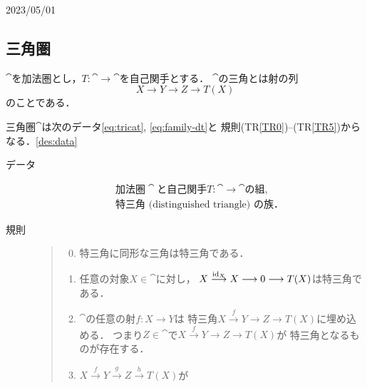 
\newpage
{\Large{2023/05/01}}
\subsection{三角圏}\label{ssec:tricat}
$\cat$を加法圏とし，$T\colon\cat\to\cat$を自己関手とする．
$\cat$の三角とは射の列
\begin{equation*}
    X\to Y\to Z\to T(X)
\end{equation*}
のことである．

\begin{Definition}
    三角圏$\cat$は次のデータ\eqref{eq:tricat}, \eqref{eq:family-dt}と
    規則(TR\ref{TR0})--(TR\ref{TR5})からなる．\ref{des:data}
    \begin{description}
        \item[データ] \begin{align}
            \text{加法圏}\cat\text{と自己関手}T\colon\cat\to\cat\text{の組},\label{eq:tricat}\\
            \text{特三角 (distinguished triangle) の族．}\label{eq:family-dt}
        \end{align}    
        \item[規則] \label{des:data}
        \begin{quote}
            \begin{enumerate}
                \setcounter{enumi}{-1}
                \renewcommand{\labelenumi}{(TR{\arabic{enumi}})}
                \item 特三角に同形な三角は特三角である．\label{TR0}
                \item 任意の対象$X\in\cat$に対し，
                    $X\overset{\mathop{\mathrm{id}}\nolimits_X}{\longrightarrow}X\longrightarrow
                    0\longrightarrow T(X)$は特三角である．\label{TR1}
                \item $\cat$の任意の射$f\colon X\to Y$は
                    特三角$X\overset{f}{\to}Y\to Z\to T(X)$に埋め込める．
                    つまり$Z\in\cat$で$X\overset{f}{\to}Y\to Z\to T(X)$が
                    特三角となるものが存在する．\label{TR2}
                \item $X\overset{f}{\to}
                    Y\overset{g}{\to} 
                    Z\overset{h}{\to} T(X)$が

\end{enumerate}
\end{quote}
\end{description}
\end{Definition}
